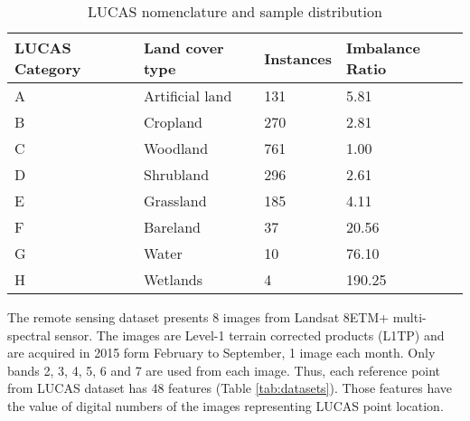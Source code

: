 \documentclass[parskip=full]{scrartcl}
\begin{document}
\begin{table}[H]
	\centering
	\begin{tabular}{|p{2.2cm}|p{2.3cm}|p{2cm}|p{2cm}|}
		\hline
		\textbf{LUCAS Category} & \textbf{Land cover type} & \textbf{Instances}
		& \textbf{Imbalance Ratio} \\
		\hline
		A & Artificial land & 131 & 5.81 \\
		\hline
		B & Cropland        & 270 & 2.81 \\
		\hline
		C & Woodland        & 761 & 1.00 \\
		\hline
		D & Shrubland       & 296 & 2.61 \\
		\hline
		E & Grassland       & 185 & 4.11 \\
		\hline
		F & Bareland        & 37  & 20.56 \\
		\hline
		G & Water           & 10  & 76.10 \\
		\hline
		H & Wetlands        & 4   & 190.25\\
		\hline
	\end{tabular}
	\caption{\label{tab:dataset_classes}LUCAS nomenclature and sample distribution}
\end{table}


The remote sensing dataset presents 8 images from Landsat 8ETM+ multi-spectral
sensor. The images are Level-1 terrain corrected products (L1TP) and are
acquired in 2015 form February to September, 1 image each month. Only bands 2,
3, 4, 5, 6 and 7 are used from each image. Thus, each reference point from
LUCAS dataset has 48 features (Table \ref{tab:datasets}). Those features have the value of
digital numbers of the images representing LUCAS point location.
\end{document}
